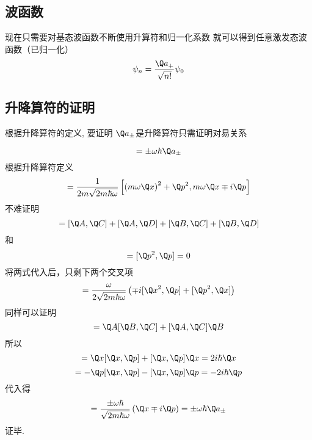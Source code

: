 \subsection{波函数}
现在只需要对基态波函数不断使用升算符和归一化系数%
就可以得到任意激发态波函数（已归一化）
\begin{equation}
{\psi _n} = \frac{{{{\Q a}_ + }}}{{\sqrt {n!} }}{\psi _0}
\end{equation}


\subsection{升降算符的证明}

根据升降算符的定义, 要证明 $\Q a_\pm$是升降算符只需证明对易关系

\begin{equation}
  [\Q H,{\Q a_ \pm }] =  \pm \omega\hbar  {\Q a_ \pm }
\end{equation}
根据升降算符定义
\begin{equation}
  [\Q H,{\Q a_ \pm }] = \frac{1}{{2m\sqrt {2m\hbar \omega } }}\left[ {{{\left( {m\omega \Q x} \right)}^2} + {{\Q p}^2},m\omega \Q x \mp i\Q p} \right]
\end{equation}
不难证明
\begin{equation}
  [\Q A + \Q B,\Q C + \Q D] = [\Q A,\Q C] + [\Q A,\Q D] + [\Q B,\Q C] + [\Q B,\Q D]
\end{equation}
和
\begin{equation}
  [{\Q x^2},\Q x] = [{\Q p^2},\Q p] = 0
\end{equation}
将两式代入后，只剩下两个交叉项
\begin{equation}
  [\Q H,{\Q a_ \pm }] = \frac{\omega }{{2\sqrt {2m\hbar \omega } }}\left( { \mp i[{{\Q x}^2},\Q p] + [{{\Q p}^2},\Q x]} \right)
\end{equation}
同样可以证明
\begin{equation}
  [\Q A\Q B,\Q C] = \Q A[\Q B,\Q C] + [\Q A,\Q C]\Q B
\end{equation}
所以
\begin{equation}
[{{\Q x}^2},\Q p] = \Q x[\Q x,\Q p] + [\Q x,\Q p]\Q x = 2i\hbar \Q x
\end{equation}
\begin{equation}
[{{\Q p}^2},\Q x] =  - \Q p[\Q x,\Q p] - [\Q x,\Q p]\Q p =  - 2i\hbar \Q p
\end{equation}
代入得
\begin{equation}
  [\Q H,{\Q a_ \pm }] = \frac{{ \pm \omega \hbar }}{{\sqrt {2m\hbar \omega } }}\left( {\Q x \mp i\Q p} \right) =  \pm \omega\hbar {\Q a_ \pm }
\end{equation}
证毕.
